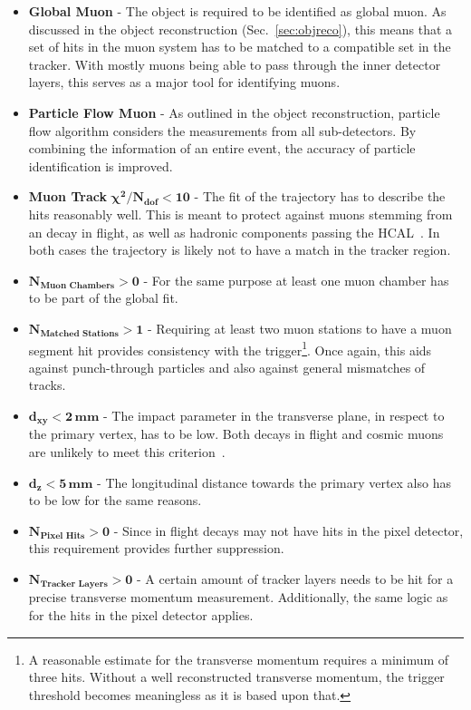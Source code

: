 \begin{itemize}
\item \textbf{Global Muon} - The object is required to be identified as global muon. As discussed in the object reconstruction (Sec.~\ref{sec:objreco}), this means that a set of hits in the muon system has to be matched to a compatible set in the tracker. With mostly muons being able to pass through the inner detector layers, this serves as a major tool for identifying muons.
\item \textbf{Particle Flow Muon} - As outlined in the object reconstruction, particle flow algorithm considers the measurements from all sub-detectors. By combining the information of an entire event, the accuracy of particle identification is improved.
\item \textbf{Muon Track} $\mathbf{\chi^2 / N_{\textbf{dof}} < 10}$ - The fit of the trajectory has to describe the hits reasonably well. This is meant to protect against muons stemming from an decay in flight, as well as hadronic components passing the HCAL~\cite{muonidcosmic}. In both cases the trajectory is likely not to have a match in the tracker region.
\item $\mathbf{N_{\textbf{Muon Chambers}} > 0}$ - For the same purpose at least one muon chamber has to be part of the global fit. 
\item $\mathbf{N_{\textbf{Matched Stations}} > 1}$ - Requiring at least two muon stations to have a muon segment hit provides consistency with the trigger\footnote{A reasonable estimate for the transverse momentum requires a minimum of three hits. Without a well reconstructed transverse momentum, the trigger threshold becomes meaningless as it is based upon that.}. Once again, this aids against punch-through particles and also against general mismatches of tracks.
\item $\mathbf{d_{xy} < 2\,\textbf{mm}}$ - The impact parameter in the transverse plane, in respect to the primary vertex, has to be low. Both decays in flight and cosmic muons are unlikely to meet this criterion~\cite{muonidcosmic}.
\item $\mathbf{d_z < 5\,\textbf{mm}}$ - The longitudinal distance towards the primary vertex also has to be low for the same reasons.
\item $\mathbf{N_{\textbf{Pixel Hits}} > 0}$ - Since in flight decays may not have hits in the pixel detector, this requirement provides further suppression.
\item $\mathbf{N_{\textbf{Tracker Layers}} > 0}$ - A certain amount of tracker layers needs to be hit for a precise transverse momentum measurement. Additionally, the same logic as for the hits in the pixel detector applies.
\end{itemize}

